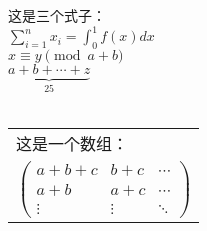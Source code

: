 \documentclass[11pt]{article}
\begin{document}
\noindent 这是三个式子：\\
$\sum_{i=1}^{n}x_{i} = \int_{0}^{1}f(x)dx$\\
$x\equiv y \pmod {a + b}$ \\
$\underbrace{a + b + \cdots + z}_{25}$ \\
\\
\begin{center}
    \begin{tabular}{l}
    这是一个数组： \\
    $
    \begin{pmatrix}
        a + b + c & b + c &\cdots \\
            a + b & a + c & \cdots \\
            \vdots & \vdots & \ddots
    \end{pmatrix}
    $
    \end{tabular}
\end{center}
\end{document}
